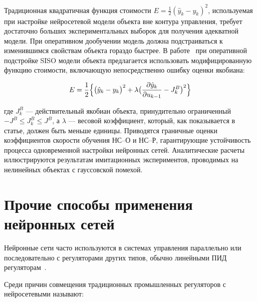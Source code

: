 
Традиционная квадратичная функция стоимости $E=\frac{1}{2}(\hat{y}_k -
y_k)^2$, используемая при настройке нейросетевой модели объекта вне
контура управления, требует достаточно больших экспериментальных
выборок для получения адекватной модели.  При оперативном дообучении
модель должна подстраиваться к изменившимся свойствам объекта гораздо
быстрее.  В работе~\cite{wangbao00} при оперативной подстройке SISO
модели объекта предлагается использовать модифицированную функцию
стоимости, включающую непосредственно ошибку оценки якобиана:

$$
E=\frac{1}{2}\Bigl\{\bigl(\hat{y}_k - y_k\bigr)^2 +
  \lambda\bigl(\frac{\partial\hat{y}_k}{\partial u_{k-1}} -
  J^B_k\bigr)^2\Bigr\}
$$

\noindent где $J^B_k$ --- действительный якобиан объекта, принудительно
ограниченный $-J^B\le J^B_k\le J^B$, а $\lambda$ --- весовой
коэффициент, который, как показывается в статье, должен быть меньше
единицы.  Приводятся граничные оценки коэффициентов скорости обучения
НС--О и НС--Р, гарантирующие устойчивость процесса одновременной
настройки нейронных сетей.  Аналитические расчеты иллюстрируются
результатам имитационных экспериментов, проводимых на нелинейных
объектах с гауссовской помехой.


\section{Прочие способы применения нейронных сетей}


Нейронные сети часто используются в системах управления параллельно
или последовательно с регуляторами других типов, обычно линейными ПИД
регуляторам~\cite{steck96,sigom00,chenmills97}.

Среди причин совмещения традиционных промышленных регуляторов с
нейросетевыми называют:

